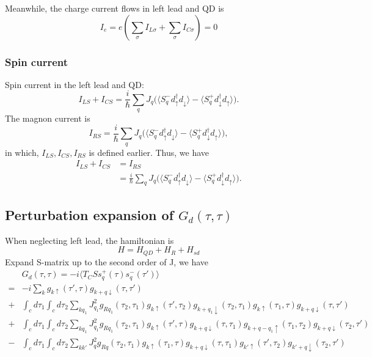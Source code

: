 \documentclass[11pt,a4paper]{article}
\begin{document}
Meanwhile, the charge current flows in left lead and QD is
\begin{equation}
I_{e} = e(\sum_{\sigma}I_{L\sigma} + \sum_{\sigma}I_{C\sigma}) = 0
\end{equation}
\subsubsection{Spin current}
Spin current in the left lead and QD:
\begin{equation}
I_{LS} + I_{CS} = \frac{i}{\hbar} \sum_{q} J_{q} \big( \big\langle S_{q}^{-}d_{\uparrow}^{\dag}d_{\downarrow}\big\rangle - \big\langle S_{q}^{+}d_{\downarrow}^{\dag}d_{\uparrow} \big\rangle \big) .
\end{equation}
The magnon current is
\begin{equation}
I_{RS} = \frac{i}{\hbar} \sum_{q} J_{q} \big( \big\langle S_{q}^{-}d_{\uparrow}^{\dag}d_{\downarrow}\big\rangle - \big\langle S_{q}^{+}d_{\downarrow}^{\dag}d_{\uparrow} \big\rangle \big) ,
\end{equation}
in which, $I_{LS}, I_{CS}, I_{RS}$ is defined earlier. Thus, we have
\begin{equation}
\begin{split}
I_{LS} + I_{CS} &= I_{RS}\\
& = \frac{i}{\hbar} \sum_{q} J_{q} \big( \big\langle S_{q}^{-}d_{\uparrow}^{\dag}d_{\downarrow}\big\rangle - \big\langle S_{q}^{+}d_{\downarrow}^{\dag}d_{\uparrow} \big\rangle \big) .
\end{split}
\end{equation}
\subsection{Perturbation expansion of $G_{d}(\tau, \tau)$}
When neglecting left lead, the hamiltonian is
\begin{equation}
H = H_{QD} + H_{R} + H_{sd}
\end{equation}
Expand S-matrix up to the second order of J, we have
\begin{equation}
\begin{split}
&G_{d}(\tau, \tau) = -i\langle T_{C}Ss_{q}^{+}(\tau)s_{q}^{-}(\tau') \rangle \\
=& -i\sum_{k} g_{k\uparrow}(\tau', \tau) g_{k+q\downarrow}(\tau, \tau') \\
+& \int_{c}d\tau_{1}\int_{c}d\tau_{2} \sum_{kq_{1}} J_{q_{1}}^{2} g_{Rq_{1}}(\tau_{2}, \tau_{1}) g_{k\uparrow}(\tau', \tau_{2}) g_{k+q_{1}\downarrow}(\tau_{2}, \tau_{1}) g_{k\uparrow}(\tau_{1}, \tau) g_{k+q\downarrow}(\tau, \tau') \\
+& \int_{c}d\tau_{1}\int_{c}d\tau_{2} \sum_{kq_{1}} J_{q_{1}}^{2} g_{Rq_{1}}(\tau_{2}, \tau_{1}) g_{k\uparrow}(\tau', \tau) g_{k+q\downarrow}(\tau, \tau_{1}) g_{k+q-q_{1}\uparrow}(\tau_{1}, \tau_{2}) g_{k+q\downarrow}(\tau_{2}, \tau') \\
-& \int_{c}d\tau_{1}\int_{c}d\tau_{2} \sum_{kk'} J_{q}^{2} g_{Rq}(\tau_{2}, \tau_{1}) g_{k\uparrow}(\tau_{1}, \tau) g_{k+q\downarrow}(\tau, \tau_{1})  g_{k'\uparrow}(\tau', \tau_{2}) g_{k'+q\downarrow}(\tau_{2}, \tau')
\end{split}
\end{equation}
\end{document}
